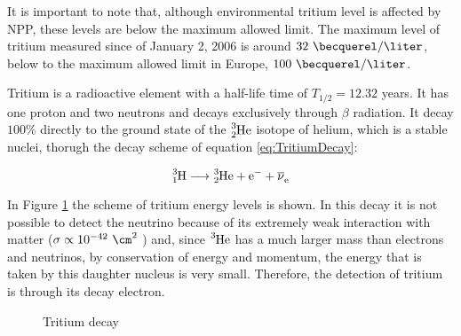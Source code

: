 It is important to note that, although environmental tritium level is affected by NPP, these levels are below the maximum allowed limit. The maximum level of tritium measured since of January 2, 2006 is around $32~\becquerel/\liter$, below to the maximum allowed limit in Europe, $100~\becquerel/\liter$.

Tritium is a radioactive element with a half-life time of $T_{1/2}= 12.32$ years. It has one proton and two neutrons and decays exclusively through $\beta$ radiation. It decay $100\%$ directly to the ground state of the $\ce{^{3}_{2}He}$ isotope of helium, which is a stable nuclei, thorugh the decay scheme of equation \ref{eq:TritiumDecay}:





\begin{equation}
\ce{^{3}_{1}H} \longrightarrow \ce{^{3}_{2}He}  + \ce{e^-}  + \ce{\overline{\nu}_e}
\label{eq:TritiumDecay}
\end{equation}

In Figure \ref{fig:TritiumDecay} the scheme of tritium energy levels is shown. In this decay it is not possible to detect the neutrino because of its extremely weak interaction with matter ($\sigma \propto 10^{-42} ~ \cm^2$ \cite{CrossSeccionNeutrino}) and, since $\ce{^{3}He}$ has a much larger mass than electrons and neutrinos, by conservation of energy and momentum, the energy that is taken by this daughter nucleus is very small. Therefore, the detection of tritium is through its decay electron. 

\begin{figure}[hbtp]
 \centering
 \caption{Tritium decay}
 \label{fig:TritiumDecay}
\end{figure}

